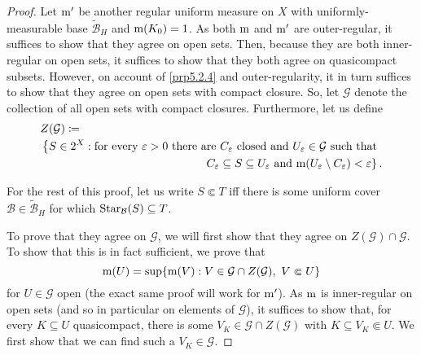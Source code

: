 \begin{thm}
\begin{savenotes}
\begin{proof}
Let $\mathrm{m} '$ be another regular uniform measure on $X$ with uniformly-measurable base $\widetilde{\mathcal{B}}_H$ and $\mathrm{m} (K_0)=1$.  As both $\mathrm{m}$ and $\mathrm{m} '$ are outer-regular, it suffices to show that they agree on open sets.  Then, because they are both inner-regular on open sets, it suffices to show that they both agree on quasicompact subsets.  However, on account of \cref{prp5.2.4} and outer-regularity, it in turn suffices to show that they agree on open sets with compact closure.  So, let $\mathcal{G}$ denote the collection of all open sets with compact closures.  Furthermore, let us define
\begin{equation}
\begin{multlined}
Z(\mathcal{G})\coloneqq \\ \left\{ S\in 2^X:\text{for every }\varepsilon >0\text{ there are }C_{\varepsilon}\text{ closed and }U_{\varepsilon}\in \mathcal{G}\text{ such that }\right. \\ \left. C_\varepsilon \subseteq S\subseteq U_{\varepsilon}\text{ and }\meas (U_{\varepsilon}\setminus C_{\varepsilon})<\varepsilon \right\} .
\end{multlined}
\end{equation}

For the rest of this proof, let us write $S\Subset T$ iff there is some uniform cover $\mathcal{B}\in \widetilde{\mathcal{B}}_H$ for which $\operatorname{Star} _{\mathcal{B}}(S)\subseteq T$.

To prove that they agree on $\mathcal{G}$, we will first show that they agree on $Z(\mathcal{G})\cap \mathcal{G}$.  To show that this is in fact sufficient, we prove that
\begin{equation}
\mathrm{m} (U)=\sup \{ \mathrm{m} (V):V\in \mathcal{G}\cap Z(\mathcal{G}),\ V\Subset U\} 
\end{equation}
for $U\in \mathcal{G}$ open (the exact same proof will work for $\mathrm{m} '$).  As $\mathrm{m}$ is inner-regular on open sets (and so in particular on elements of $\mathcal{G}$), it suffices to show that, for every $K\subseteq U$ quasicompact, there is some $V_K\in \mathcal{G}\cap Z(\mathcal{G})$ with $K\subseteq V_K\Subset U$.  We first show that we can find such a $V_K\in \mathcal{G}$.


\end{proof}
\end{savenotes}
\end{thm}
